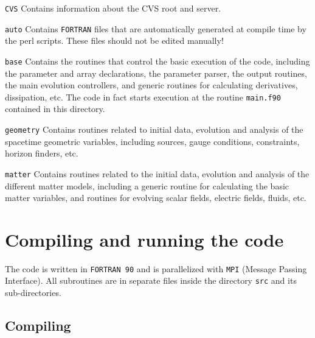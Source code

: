 \documentclass[12pt]{article}
\begin{document}
\begin{list}{}{
\setlength{\leftmargin}{40mm}
\setlength{\labelsep}{10mm}
\setlength{\labelwidth}{25mm}}

\item[\texttt{CVS}] Contains information about the CVS root and server.

\item[\texttt{auto}] Contains \texttt{FORTRAN} files that are
  automatically generated at compile time by the perl scripts.  These
  files should not be edited manually!

\item[\texttt{base}] Contains the routines that control the basic
  execution of the code, including the parameter and array
  declarations, the parameter parser, the output routines, the main
  evolution controllers, and generic routines for calculating
  derivatives, dissipation, etc.  The code in fact starts execution at
  the routine \texttt{main.f90} contained in this directory.

\item[\texttt{geometry}] Contains routines related to initial data,
  evolution and analysis of the spacetime geometric variables,
  including sources, gauge conditions, constraints, horizon finders,
  etc.

\item[\texttt{matter}] Contains routines related to the initial data,
  evolution and analysis of the different matter models, including a
  generic routine for calculating the basic matter variables, and
  routines for evolving scalar fields, electric fields, fluids, etc.

\end{list}

\vspace{3mm}



\section{Compiling and running the code}

The code is written in \texttt{FORTRAN 90} and is parallelized with
\texttt{MPI} (Message Passing Interface).  All subroutines are in
separate files inside the directory \texttt{src} and its
sub-directories.

\subsection{Compiling}
\label{sec:compiling}
\end{document}
